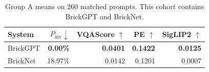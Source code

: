 \begin{table}[t]
\centering\small
\setlength{\tabcolsep}{3pt}
\begin{tabular}{lrrrr}
\toprule
System & $P_{\mathrm{inv}}\downarrow$ & VQAScore $\uparrow$ & PE $\uparrow$ & SigLIP2 $\uparrow$ \\
\midrule
BrickGPT & \textbf{0.00\%} & \textbf{0.0401} & \textbf{0.1422} & \textbf{0.0125} \\
BrickNet & 18.97\% & 0.0142 & 0.1201 & 0.0007 \\
\bottomrule
\end{tabular}
\caption{Group A means on 260 matched prompts. This cohort contains BrickGPT and BrickNet.}
\label{tab:group-a}
\end{table}
